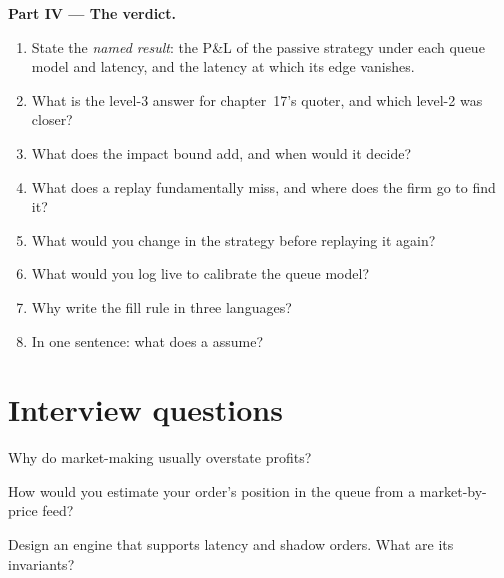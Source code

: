 \begin{problem}
\medskip\noindent\textbf{Part IV --- The verdict.}
\begin{enumerate}[resume]
\item State the \emph{named result}: the P\&L of the passive strategy under each queue model and latency, and the latency at which its edge vanishes.
\item What is the level-3 answer for chapter~17's  quoter, and which level-2  was closer?
\item What does the impact bound add, and when would it decide?
\item What does a replay fundamentally miss, and where does the firm go to find it?
\item What would you change in the strategy before replaying it again?
\item What would you log live to calibrate the queue model?
\item Why write the fill rule in three languages?
\item In one sentence: what does a  assume?
\end{enumerate}
\end{problem}

\section{Interview questions}

\begin{interviewq}\label{iq:rs:order-book-replay-simulation:1}
Why do market-making  usually overstate profits?
\end{interviewq}

\begin{interviewq}\label{iq:rs:order-book-replay-simulation:2}
How would you estimate your order's position in the queue from a market-by-price feed?
\end{interviewq}

\begin{interviewq}\label{iq:rs:order-book-replay-simulation:3}
Design an  engine that supports latency and shadow orders. What are its invariants?
\end{interviewq}

